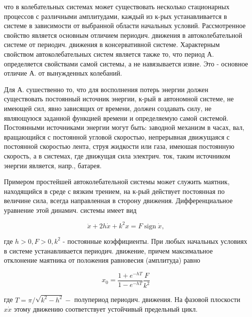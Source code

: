 \documentclass[10pt]{article}
\begin{document}
что в колебательных системах может существовать несколько стационарных процессов с различными амплитудами, каждый из к-рых устанавливается в системе в зависимости от выбранной области начальных условий. Рассмотренное свойство является основным отличием периодич. движения в автоколебательной системе от периодич. движения в консервативной системе. Характерным свойством автоколебательных систем является также то, что период А. определяется свойствами самой системы, а не навязывается извне. Это - основное отличие А. от вынужденных колебаний.



Для А. сушественно то, что для восполнения потерь энергии должен существовать постоянный источник энергии, к-рый в автономной системе, не имеющей сил, явно зависящих от времени, должен создавать силу, не являющуюся заданной функцией времени и определяемую самой системой. Постоянными источниками энергии могут быть: заводной механизм в часах, вал, вращающийся с постоянной угловой скоростью, непрерывная движущаяся с постоянной скоростью лента, струя жидкости или газа, имеюшая постоянную скорость, а в системах, где движущая сила электрич. ток, таким источником энергии является, напр., батарея.



Примером простейшей автоколебательной системы может служить маятник, находящийся в среде с вязким трением, на к-рый действует постоянная по величине сила, всегда направленная в сторону движения. Дифференциальное уравнение этой динамич. системы имеет вид



\[

\ddot{x}+2 h \dot{x}+k^{2} x=F \operatorname{sign} \dot{x},

\]



где $h>0, F>0, k^{2}$ - постоянные коэффициенты. При любых начальных условиях в системе устанавливается периодич. движение, причем максимальное отклонение маятника от положения равновесия (амплитуда) равно



\[

x_{0}=\frac{1+e^{-h T}}{1-e^{-h T}} \frac{F}{k^{2}}

\]



где $T=\pi / \sqrt{k^{2}-h^{2}}-$ полупериод периодич. движения. На фазовой плоскости $x \dot{x}$ этому движению соответствует устойчивый предельный цикл.
\end{document}
